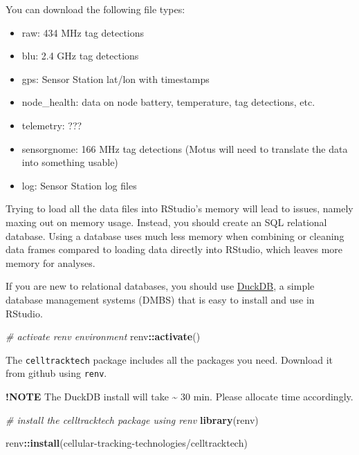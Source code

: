 \documentclass[
]{book}
\newenvironment{Shaded}{\begin{snugshade}}{\end{snugshade}}
\newcommand{\CommentTok}[1]{\textcolor[rgb]{0.56,0.35,0.01}{\textit{#1}}}
\newcommand{\FunctionTok}[1]{\textcolor[rgb]{0.13,0.29,0.53}{\textbf{#1}}}
\newcommand{\NormalTok}[1]{#1}
\newcommand{\SpecialCharTok}[1]{\textcolor[rgb]{0.81,0.36,0.00}{\textbf{#1}}}
\newcommand{\StringTok}[1]{\textcolor[rgb]{0.31,0.60,0.02}{#1}}
\providecommand{\tightlist}{%
  \setlength{\itemsep}{0pt}\setlength{\parskip}{0pt}}
\begin{document}
You can download the following file types:

\begin{itemize}
\tightlist
\item
  raw: 434 MHz tag detections
\item
  blu: 2.4 GHz tag detections
\item
  gps: Sensor Station lat/lon with timestamps
\item
  node\_health: data on node battery, temperature, tag detections, etc.
\item
  telemetry: ???
\item
  sensorgnome: 166 MHz tag detections (Motus will need to translate the data into something usable)
\item
  log: Sensor Station log files
\end{itemize}

Trying to load all the data files into RStudio's memory will lead to issues, namely maxing out on memory usage. Instead, you should create an SQL relational database. Using a database uses much less memory when combining or cleaning data frames compared to loading data directly into RStudio, which leaves more memory for analyses.

If you are new to relational databases, you should use \href{https://duckdb.org/why_duckdb}{DuckDB}, a simple database management systems (DMBS) that is easy to install and use in RStudio.

\begin{Shaded}
\begin{Highlighting}[]
\CommentTok{\# activate renv environment}
\NormalTok{renv}\SpecialCharTok{::}\FunctionTok{activate}\NormalTok{()}
\end{Highlighting}
\end{Shaded}

The \texttt{celltracktech} package includes all the packages you need. Download it from github using \texttt{renv}.

\textbf{!NOTE} The DuckDB install will take \textasciitilde{} 30 min. Please allocate time accordingly.

\begin{Shaded}
\begin{Highlighting}[]
\CommentTok{\# install the celltracktech package using renv}
\FunctionTok{library}\NormalTok{(renv)}

\NormalTok{renv}\SpecialCharTok{::}\FunctionTok{install}\NormalTok{(}\StringTok{\textquotesingle{}cellular{-}tracking{-}technologies/celltracktech\textquotesingle{}}\NormalTok{)}
\end{Highlighting}
\end{Shaded}
\end{document}
